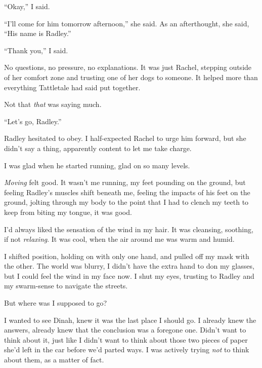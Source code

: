 ``Okay,'' I said.



``I'll come for him tomorrow afternoon,'' she said.  As an afterthought, she said, ``His name is Radley.''



``Thank you,'' I said.



No questions, no pressure, no explanations.  It was just Rachel, stepping outside of her comfort zone and trusting one of her dogs to someone.  It helped more than everything Tattletale had said put together.



Not that \emph{that} was saying much.



``Let's go, Radley.''



Radley hesitated to obey.  I half-expected Rachel to urge him forward, but she didn't say a thing, apparently content to let me take charge.



I was glad when he started running, glad on so many levels.



\emph{Moving} felt good.  It wasn't me running, my feet pounding on the ground, but feeling Radley's muscles shift beneath me, feeling the impacts of his feet on the ground, jolting through my body to the point that I had to clench my teeth to keep from biting my tongue, it was good.



I'd always liked the sensation of the wind in my hair.  It was cleansing, soothing, if not \emph{relaxing}.  It was cool, when the air around me was warm and humid.



I shifted position, holding on with only one hand, and pulled off my mask with the other. The world was blurry, I didn't have the extra hand to don my glasses, but I could feel the wind in my face now.  I shut my eyes, trusting to Radley and my swarm-sense to navigate the streets.



But where was I supposed to go?



I wanted to see Dinah, knew it was the last place I should go.  I already knew the answers, already knew that the conclusion was a foregone one.  Didn't want to think about it, just like I didn't want to think about those two pieces of paper she'd left in the car before we'd parted ways.  I was actively trying \emph{not} to think about them, as a matter of fact.



